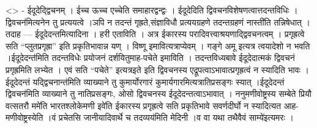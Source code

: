 \textless{}\textgreater{} - ईदूदेद्द्विचनम् । ईच्च ऊच्च एच्चेति
समाहारद्वन्द्वः । ईदूदेदिति द्विवचनविशेषणत्वात्तदन्तविधिः
।द्विवचन॑मित्यनेन तु प्रत्ययत्वे ।ञपि न तदन्तं गृह्रते,संज्ञाविधौ
प्रत्ययग्रहणे तदन्तग्रहणं नास्ती॑ति तन्निषेधात् । तदाह ---
ईदूदेदन्तमित्यादिना । हरी एताविति । अत्र ईकारस्य
परादिवत्त्वाश्रयणाद्द्विवचनत्वम् । प्रगृह्रत्वे सति ``प्लुतप्रगृह्रा''
इति प्रकृतिभावान्न यण् । विष्णू इमावित्यत्राप्येवम् । गङ्गे अमू इत्यत्र
त्वयादेशो न भवति ।ईदूदेदन्त॑मिति तदन्तविधेः प्रयोजनं दर्शयितुमाह-पचेते
इमाविति । तदन्तविध्यबावे ईदूदेदात्मकं द्विवचनं प्रगृह्रमिति लभ्येत । एवं
सति ``पचेते'' इत्यत्रइते इति द्विवचनस्य एद्रूपत्वाऽभावात्प्रगृह्रत्वं न
स्यादिति भावः ।ईदूदेदन्तं यद्द्विचनान्त॑मिति व्याख्याने तु कुमार्योरगारं
कुमार्यगारमित्यत्रातिप्रसङ्गः स्यात् ।ईदूदेदन्तं द्विवचन॑मिति व्याख्याने
तु नातिप्रसङ्गः, ओसो द्विवचनस्य ईदूदेदन्तत्वाऽभावात् । ननुमणीवोष्ट्रस्य
सम्बेते प्रियौ वत्सतरौ ममे॑ति भारतश्लोकेमणी इवे॑ति ईकारस्य प्रगृह्रत्वे
सति प्रकृतिभावे सवर्णदीर्घो न स्यादित्यत आह-मणीवोष्ट्रस्येति ।वं
प्रचेतसि जानीयादिवार्थे च तदव्यय॑मिति मेदिनी ।व वा यथा तथैवैवं
साम्ये॑इत्यमरः ।
